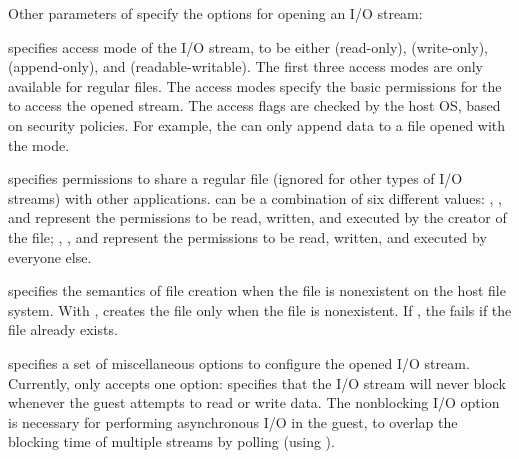 Other parameters of  specify the options for opening an I/O stream:

\begin{compactitem}

\item
{} specifies access mode of the I/O stream, to be either  (read-only),  (write-only),  (append-only), and  (readable-writable).
The first three access modes are only available
for regular files. %
The access modes specify the basic permissions for the \libos{} to access the opened stream. %
The access flags are checked by the host OS, based on security policies.
For example, the \libos{} can only append data to a file opened with the  mode.

\item
{} specifies permissions to share a regular file (ignored for other types of  I/O streams)
with other applications. %
 can be a combination of six different values:
, , and 
represent the permissions to be read, written, and executed by the creator of the file;
, , and 
represent the permissions to be read, written, and executed by everyone else.

\item
{} specifies the semantics of file creation
when the file is nonexistent on the host file system.
With ,
 creates the file only when the file is nonexistent.
If ,
the \hostapi{} fails if the file already exists.

\item
{} specifies a set of miscellaneous options to configure the opened I/O stream.
Currently,  only accepts one option:  specifies that the I/O stream will never block whenever the guest attempts to read or write data.
The nonblocking I/O option is necessary for performing asynchronous I/O in the guest, to overlap the blocking time of multiple streams by polling (using ).

\end{compactitem}


